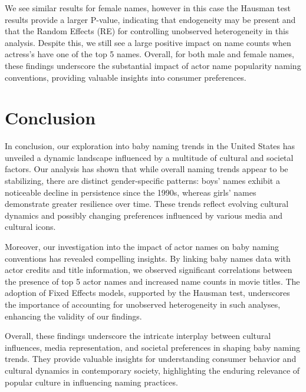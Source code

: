 \documentclass[11pt,preprint, authoryear]{elsarticle}
\numberwithin{equation}{section}
\numberwithin{figure}{section}
\numberwithin{table}{section}
\begin{document}
\hfill

We see similar results for female names, however in this case the
Hausman test results provide a larger P-value, indicating that
endogeneity may be present and that the Random Effects (RE) for
controlling unobserved heterogeneity in this analysis. Despite this, we
still see a large positive impact on name counts when actress's have one
of the top 5 names. Overall, for both male and female names, these
findings underscore the substantial impact of actor name popularity
naming conventions, providing valuable insights into consumer
preferences.

\section{Conclusion}\label{conclusion}

In conclusion, our exploration into baby naming trends in the United
States has unveiled a dynamic landscape influenced by a multitude of
cultural and societal factors. Our analysis has shown that while overall
naming trends appear to be stabilizing, there are distinct
gender-specific patterns: boys' names exhibit a noticeable decline in
persistence since the 1990s, whereas girls' names demonstrate greater
resilience over time. These trends reflect evolving cultural dynamics
and possibly changing preferences influenced by various media and
cultural icons.

Moreover, our investigation into the impact of actor names on baby
naming conventions has revealed compelling insights. By linking baby
names data with actor credits and title information, we observed
significant correlations between the presence of top 5 actor names and
increased name counts in movie titles. The adoption of Fixed Effects
models, supported by the Hausman test, underscores the importance of
accounting for unobserved heterogeneity in such analyses, enhancing the
validity of our findings.

Overall, these findings underscore the intricate interplay between
cultural influences, media representation, and societal preferences in
shaping baby naming trends. They provide valuable insights for
understanding consumer behavior and cultural dynamics in contemporary
society, highlighting the enduring relevance of popular culture in
influencing naming practices.
\end{document}
